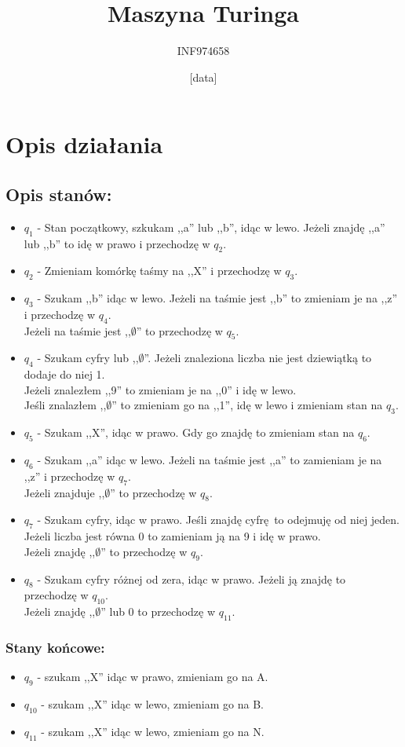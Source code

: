 \documentclass[a4paper,12pt]{article}
\title{Maszyna Turinga}
\author{INF974658}
\date{[data]}
\begin{document}
\section{Opis działania}

\subsection*{Opis stanów:}

\begin{itemize}
	\item $q_1$ - Stan początkowy, szkukam ,,a'' lub ,,b'', idąc w lewo. Jeżeli znajdę ,,a'' lub ,,b'' to idę w prawo i przechodzę w $q_2$.
	\item $q_2$ - Zmieniam komórkę taśmy na ,,X'' i przechodzę w $q_3$.
	\item $q_3$ - Szukam ,,b'' idąc w lewo. Jeżeli na taśmie jest ,,b'' to zmieniam je na ,,z'' i przechodzę w $q_4$.\\
		Jeżeli na taśmie jest ,,$\emptyset$'' to przechodzę w $q_5$.
	\item $q_4$ - Szukam cyfry lub ,,$\emptyset$''. Jeżeli znaleziona liczba nie jest dziewiątką to dodaje do niej 1.\\
		Jeżeli znalezłem ,,9'' to zmieniam je na ,,0'' i idę w lewo.\\
		Jeśli znalazłem ,,$\emptyset$'' to zmieniam go na ,,1'', idę w lewo i zmieniam stan na $q_3$. 
	\item $q_5$ - Szukam ,,X'', idąc w prawo. Gdy go znajdę to zmieniam stan na $q_6$.
	\item $q_6$ - Szukam ,,a'' idąc w lewo.
			Jeżeli na taśmie jest ,,a'' to zamieniam je na ,,z'' i  przechodzę w $q_7$.\\
			Jeżeli znajduje ,,$\emptyset$'' to przechodzę w $q_8$.
	\item $q_7$ - Szukam cyfry, idąc w prawo. Jeśli znajdę cyfrę to odejmuję od niej jeden. \\
			Jeżeli liczba jest równa 0 to zamieniam ją na 9 i idę w prawo.\\
			Jeżeli znajdę ,,$\emptyset$'' to przechodzę w $q_9$.
	\item $q_8$ - Szukam cyfry różnej od zera, idąc w prawo. Jeżeli ją znajdę to przechodzę w $q_{10}$.\\
			Jeżeli znajdę ,,$\emptyset$'' lub 0 to przechodzę w $q_{11}$.
\end{itemize}
\subsubsection*{Stany końcowe:}
\begin{itemize}
	\item $q_9$ - szukam ,,X'' idąc w prawo, zmieniam go na A.
	\item $q_{10}$ - szukam ,,X'' idąc w lewo, zmieniam go na B.
	\item $q_{11}$ - szukam ,,X'' idąc w lewo, zmieniam go na N.
\end{itemize}
\end{document}
